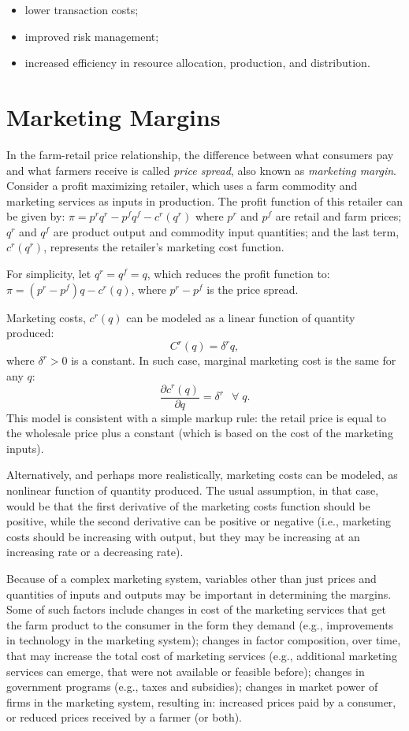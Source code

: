 \documentclass[
  oneside]{book}
\providecommand{\tightlist}{%
  \setlength{\itemsep}{0pt}\setlength{\parskip}{0pt}}
\begin{document}
\begin{itemize}
\tightlist
\item
  lower transaction costs;
\item
  improved risk management;
\item
  increased efficiency in resource allocation, production, and distribution.
\end{itemize}

\hypertarget{marketing-margins}{%
\section{Marketing Margins}\label{marketing-margins}}

In the farm-retail price relationship, the difference between what consumers pay and what farmers receive is called \emph{price spread}, also known as \emph{marketing margin}. Consider a profit maximizing retailer, which uses a farm commodity and marketing services as inputs in production. The profit function of this retailer can be given by: \(\pi = p^r q^r - p^f q^f - c^r(q^r)\) where \(p^r\) and \(p^f\) are retail and farm prices; \(q^r\) and \(q^f\) are product output and commodity input quantities; and the last term, \(c^r(q^r)\), represents the retailer's marketing cost function.

For simplicity, let \(q^r=q^f=q\), which reduces the profit function to: \(\pi = (p^r - p^f) q - c^r(q)\), where \(p^r - p^f\) is the price spread.

Marketing costs, \(c^r(q)\) can be modeled as a linear function of quantity produced: \[C^r(q) = \delta^r q,\] where \(\delta^r > 0\) is a constant. In such case, marginal marketing cost is the same for any \(q\): \[\frac{\partial c^r(q)}{\partial q} = \delta^r\;~~\forall\;q.\] This model is consistent with a simple markup rule: the retail price is equal to the wholesale price plus a constant (which is based on the cost of the marketing inputs).

Alternatively, and perhaps more realistically, marketing costs can be modeled, as nonlinear function of quantity produced. The usual assumption, in that case, would be that the first derivative of the marketing costs function should be positive, while the second derivative can be positive or negative (i.e., marketing costs should be increasing with output, but they may be increasing at an increasing rate or a decreasing rate).

Because of a complex marketing system, variables other than just prices and quantities of inputs and outputs may be important in determining the margins. Some of such factors include changes in cost of the marketing services that get the farm product to the consumer in the form they demand (e.g., improvements in technology in the marketing system); changes in factor composition, over time, that may increase the total cost of marketing services (e.g., additional marketing services can emerge, that were not available or feasible before); changes in government programs (e.g., taxes and subsidies); changes in market power of firms in the marketing system, resulting in: increased prices paid by a consumer, or reduced prices received by a farmer (or both).
\end{document}
